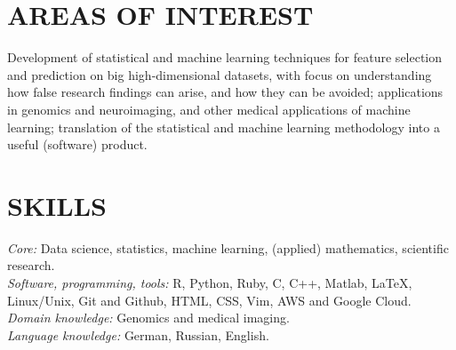 \documentclass[overlapped, line, 10pt]{res} %
\begin{document}


\address{
  Web: \href{http://www.alexejgossmann.com/}{alexejgossmann.com} \textbar
  LinkedIn: \href{https://www.linkedin.com/in/alexejgossmann/}{alexejgossmann} \textbar
  Github: \href{https://github.com/agisga}{agisga} \textbar
  Email: \href{mailto:agossman@tulane.edu}{agossman@tulane.edu}
}


\begin{resume}




\section{AREAS OF INTEREST}

Development of statistical and machine learning techniques for feature selection and prediction on big high-dimensional datasets, with focus on understanding how false research findings can arise, and how they can be avoided;
applications in genomics and neuroimaging, and other medical applications of machine learning;
translation of the statistical and machine learning methodology into a useful (software) product.


\section{SKILLS}

{\sl Core:} Data science, statistics, machine learning, (applied) mathematics, scientific research.\\
{\sl Software, programming, tools:} R, Python, Ruby, C, C++, Matlab, \LaTeX, Linux/Unix, Git and Github, HTML, CSS, Vim, AWS and Google Cloud.\\
{\sl Domain knowledge:} Genomics and medical imaging.\\
{\sl Language knowledge:} German, Russian, English.


\end{resume}
\end{document}
